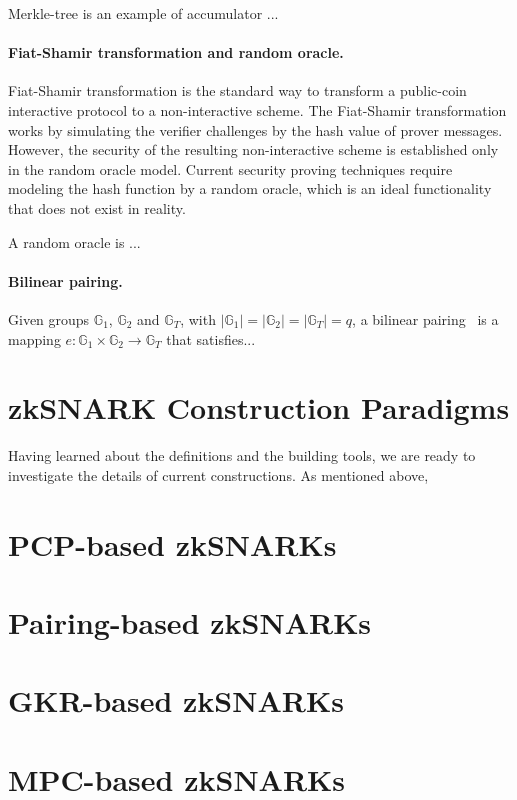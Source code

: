 \documentclass[acmtog]{acmart}
\newcommand{\bbG}{\mathbb{G}}
\begin{document}
Merkle-tree is an example of accumulator ...

\paragraph{Fiat-Shamir transformation and random oracle.}
Fiat-Shamir transformation is the standard way to transform a public-coin interactive protocol to a non-interactive scheme.
The Fiat-Shamir transformation works by simulating the verifier challenges by the hash value of prover messages.
However, the security of the resulting non-interactive scheme is established only in the random oracle model.
Current security proving techniques require modeling the hash function by a random oracle, which is an ideal functionality that does not exist in reality.

A random oracle is ...

\paragraph{Bilinear pairing.}
Given groups $\bbG_1$, $\bbG_2$ and $\bbG_T$, with $|\bbG_1|=|\bbG_2|=|\bbG_T|=q$, a bilinear pairing~\cite{BonehF01} is a mapping $e:\bbG_1\times\bbG_2\to\bbG_T$ that satisfies...

\section{zkSNARK Construction Paradigms}

Having learned about the definitions and the building tools, we are ready to investigate the details of current constructions.
As mentioned above,

\section{PCP-based zkSNARKs}

\section{Pairing-based zkSNARKs}

\section{GKR-based zkSNARKs}

\section{MPC-based zkSNARKs}
\end{document}
